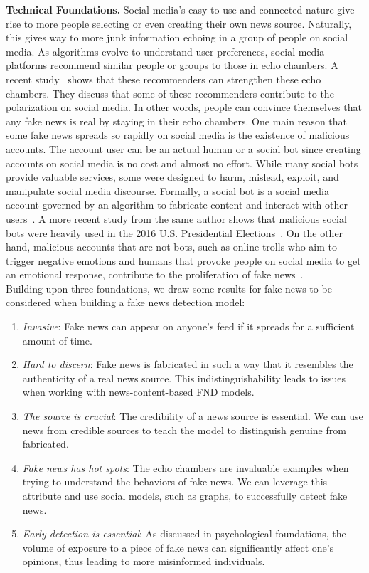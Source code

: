 \textbf{Technical Foundations.} Social media's easy-to-use and connected nature give rise to more people selecting or even creating their own news source. Naturally, this gives way to more junk information echoing in a group of people on social media. As algorithms evolve to understand user preferences, social media platforms recommend similar people or groups to those in echo chambers. A recent study~\parencite{TheEffectOfPeopleRecommenderOnEchoChambers_Cinus}  shows that these recommenders can strengthen these echo chambers. They discuss that some of these recommenders contribute to the polarization on social media. In other words, people can convince themselves that any fake news is real by staying in their echo chambers. One main reason that some fake news spreads so rapidly on social media is the existence of malicious accounts. The account user can be an actual human or a social bot since creating accounts on social media is no cost and almost no effort. While many social bots provide valuable services, some were designed to harm, mislead, exploit, and manipulate social media discourse. Formally, a social bot is a social media account governed by an algorithm to fabricate content and interact with other users~\parencite{TheRiseOfSocialBots_Ferrara}. A more recent study from the same author shows that malicious social bots were heavily used in the 2016 U.S. Presidential
Elections~\parencite{SocialBotsDistortThe2016USPresidentialElection_Bessi}. On the other hand, malicious accounts that are not bots, such as
online trolls who aim to trigger negative emotions and humans that provoke people on social media to get an emotional response, contribute to
the proliferation of fake news~\parencite{AnyoneCanBecomeATroll_Cheng}.\\
Building upon three foundations, we draw some results for fake news to be considered when building a fake news detection model:
\begin{enumerate}
    \item \emph{Invasive}: Fake news can appear on anyone’s feed if it spreads for a sufficient amount of time.
    \item \emph{Hard to discern}: Fake news is fabricated in such a way that it resembles the authenticity of a real news source. This
          indistinguishability leads to issues when working with news-content-based FND models.
    \item \emph{The source is crucial}: The credibility of a news source is essential. We can use news from credible sources to teach the model
          to distinguish genuine from fabricated.
    \item \emph{Fake news has hot spots}: The echo chambers are invaluable examples when trying to understand the behaviors of fake news. We can
          leverage this attribute and use social models, such as graphs, to successfully detect fake news.
    \item \emph{Early detection is essential}: As discussed in psychological foundations, the volume of exposure to a piece of fake news can significantly affect one’s opinions, thus leading to more misinformed individuals.
\end{enumerate}

